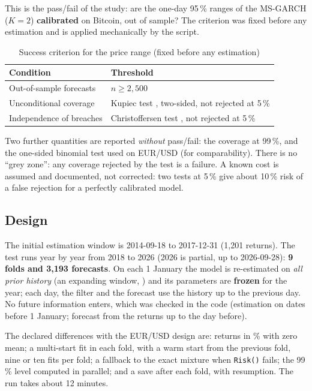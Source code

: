 \documentclass[12pt,a4paper]{article}
\begin{document}
This is the pass/fail of the study: are the one-day 95\,\% ranges of the MS-GARCH ($K=2$) \textbf{calibrated} on Bitcoin, out of sample? The criterion was fixed before any estimation and is applied mechanically by the script.

\begin{table}[H]
	\centering
	\caption{Success criterion for the price range (fixed before any estimation)}
	\label{tab:bt-criterion}
	\begin{tabular}{ll}
		\toprule
		Condition & Threshold \\
		\midrule
		Out-of-sample forecasts & $n\ge 2{,}500$ \\
		Unconditional coverage & Kupiec test \citep{kupiec1995}, two-sided, not rejected at 5\,\% \\
		Independence of breaches & Christoffersen test \citep{christoffersen1998}, not rejected at 5\,\% \\
		\bottomrule
	\end{tabular}
\end{table}

Two further quantities are reported \emph{without} pass/fail: the coverage at 99\,\%, and the one-sided binomial test used on EUR/USD (for comparability). There is no ``grey zone'': any coverage rejected by the test is a failure. A known cost is assumed and documented, not corrected: two tests at 5\,\% give about 10\,\% risk of a false rejection for a perfectly calibrated model.

\subsection{Design}

The initial estimation window is 2014-09-18 to 2017-12-31 (1,201 returns). The test runs year by year from 2018 to 2026 (2026 is partial, up to 2026-09-28): \textbf{9 folds and 3,193 forecasts}. On each 1 January the model is re-estimated on \emph{all prior history} (an expanding window, \citealt{west1996}) and its parameters are \textbf{frozen} for the year; each day, the filter and the forecast use the history up to the previous day. No future information enters, which was checked in the code (estimation on dates before 1 January; forecast from the returns up to the day before).

The declared differences with the EUR/USD design are: returns in \% with zero mean; a multi-start fit in each fold, with a warm start from the previous fold, nine or ten fits per fold; a fallback to the exact mixture when \texttt{Risk()} fails; the 99\,\% level computed in parallel; and a save after each fold, with resumption. The run takes about 12 minutes.
\end{document}
